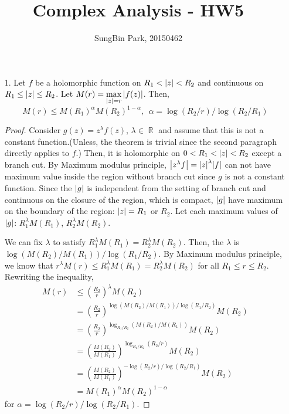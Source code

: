 \documentclass{article}
\DeclareMathOperator{\rr}{\mathbb{R}}
\begin{document}
\title{Complex Analysis - HW5}
\author{SungBin Park, 20150462} 

\maketitle
\begin{enumerate}
\item[1.] Let $f$ be a holomorphic function on $R_1<\abs{z}<R_2$ and continuous on $R_1\leq \abs{z}\leq R_2$. Let $M(r)=\max\limits_{\abs{z}=r}\abs{f(z)}$. Then,
\begin{equation*}
M(r)\leq M(R_1)^{\alpha}M(R_2)^{1-\alpha},~~\alpha=\log(R_2/r)/\log(R_2/R_1)
\end{equation*}
\begin{proof}
Consider $g(z)=z^\lambda f(z)$, $\lambda\in \rr$ and assume that this is not a constant function.(Unless, the theorem is trivial since the second paragraph directly applies to $f$.) Then, it is holomorphic on $0<R_1<\abs{z}<R_2$ except a branch cut. By Maximum modulus principle, $\abs{z^\lambda f}=\abs{z}^\lambda\abs{f}$ can not have maximum value inside the region without branch cut since $g$ is not a constant function. Since the $\abs{g}$ is independent from the setting of branch cut and continuous on the closure of the region, which is compact, $\abs{g}$ have maximum on the boundary of the region: $\abs{z}=R_1$ or $R_2$. Let each maximum values of $\abs{g}$: $R_1^\lambda M(R_1)$, $R_2^\lambda M(R_2)$.

We can fix $\lambda$ to satisfy $R_1^\lambda M(R_1)=R_2^\lambda M(R_2)$. Then, the $\lambda$ is $\log(M(R_2)/M(R_1))/\log(R_1/R_2)$. By Maximum modulus principle, we know that $r^\lambda M(r)\leq R_1^\lambda M(R_1)=R_2^\lambda M(R_2)$ for all $R_1\leq r\leq R_2$. Rewriting the inequality,
\begin{equation*}
\begin{split}
M(r)&\leq \left(\frac{R_2}{r}\right)^\lambda M(R_2) \\
&= \left(\frac{R_2}{r}\right)^{\log(M(R_2)/M(R_1))/\log(R_1/R_2)} M(R_2) \\
&=\left(\frac{R_2}{r}\right)^{\log_{R_1/R_2}(M(R_2)/M(R_1))} M(R_2) \\
&=\left(\frac{M(R_2)}{M(R_1)}\right)^{\log_{R_1/R_2}(R_2/r)} M(R_2) \\
&=\left(\frac{M(R_2)}{M(R_1)}\right)^{-\log(R_2/r)/\log({R_2/R_1})} M(R_2) \\
&=M(R_1)^\alpha M(R_2)^{1-\alpha}
\end{split}
\end{equation*}
for $\alpha=\log(R_2/r)/\log({R_2/R_1})$.
\end{proof}
\end{enumerate}
\end{document}
